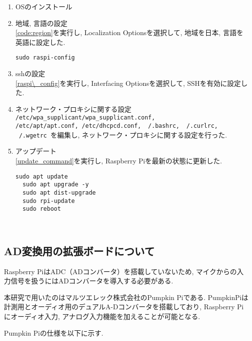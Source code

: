 \begin{enumerate}
\renewcommand{\labelenumi}{(\arabic{enumi})}
\item
  OSのインストール
\item
  地域, 言語の設定 \\
  \ref{code:region}を実行し, Localization Optionsを選択して, 地域を日本, 言語を英語に設定した. 
  \begin{lstlisting}[caption=Raspberry Piのコンフィグレーションツールの起動コマンド, label=raspi\_config]
  sudo raspi-config
  \end{lstlisting}
\item
  sshの設定 \\
  \ref{raspi\_config}を実行し, Interfacing Optionsを選択して, SSHを有効に設定した. 
\item
  ネットワーク・プロキシに関する設定 \\
  \texttt{/etc/wpa\_supplicant/wpa\_supplicant.conf, \\
  /etc/apt/apt.conf, 
  /etc/dhcpcd.conf, 
  ~/.bashrc, 
  ~/.curlrc, 
  ~/.wgetrc
  }を編集し, ネットワーク・プロキシに関する設定を行った. 

\item
  アップデート \\
  \ref{update_command}を実行し, Raspberry Piを最新の状態に更新した. 

  \begin{lstlisting}[caption=Raspberry Piのアップデートコマンド,label=update_command]
  sudo apt update 
  sudo apt upgrade -y 
  sudo apt dist-upgrade
  sudo rpi-update
  sudo reboot
  \end{lstlisting}
\end{enumerate}

\
\subsection{AD変換用の拡張ボードについて}\label{about-adc}

Raspberry
PiはADC（ADコンバータ）を搭載していないため, マイクからの入力信号を扱うにはADコンバータを導入する必要がある. 

本研究で用いたのはマルツエレック株式会社のPumpkin Pi\cite{pumpkin_pi:online}である. PumpkinPiは計測用とオーディオ用のデュアルA-Dコンバータを搭載しており, Raspberry Piにオーディオ入力, アナログ入力機能を加えることが可能となる. 

Pumpkin Piの仕様を以下に示す. 

